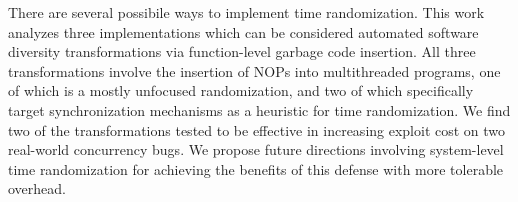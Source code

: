 There are several possibile ways to implement time randomization.
This work analyzes three implementations which can be considered automated software diversity transformations via function-level garbage code insertion.
All three transformations involve the insertion of NOPs into multithreaded programs, one of which is a mostly unfocused randomization, and two of which specifically target synchronization mechanisms as a heuristic for time randomization.
We find two of the transformations tested to be effective in increasing exploit cost on two real-world concurrency bugs.
We propose future directions involving system-level time randomization for achieving the benefits of this defense with more tolerable overhead.
